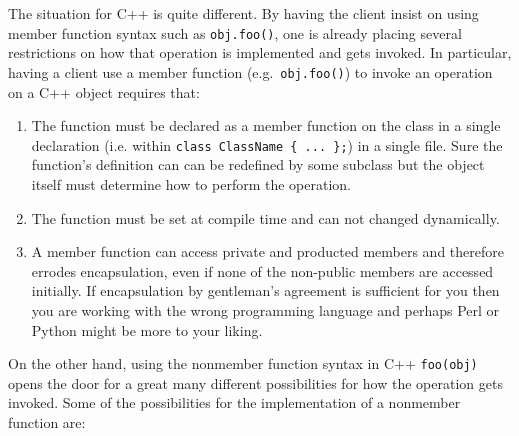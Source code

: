 \documentclass[pdf,ps2pdf,11pt]{SANDreport}
\begin{document}
The situation for C++ is quite different.  By having the client insist on
using member function syntax such as {}\texttt{obj.foo()}, one is already
placing several restrictions on how that operation is implemented and gets
invoked.  In particular, having a client use a member function (e.g.\
{}\texttt{obj.foo()}) to invoke an operation on a C++ object requires that:

\begin{enumerate}

{}\item{}The function must be declared as a member function on the class in a
single declaration (i.e. within {}\texttt{class ClassName \{ ... \};}) in a
single file.  Sure the function's definition can can be redefined by some
subclass but the object itself must determine how to perform the operation.

{}\item{}The function must be set at compile time and can not changed
dynamically.

{}\item{}A member function can access private and producted members and
therefore errodes encapsulation, even if none of the non-public members are
accessed initially.  If encapsulation by gentleman's agreement is sufficient
for you then you are working with the wrong programming language and perhaps
Perl or Python might be more to your liking.

\end{enumerate}

On the other hand, using the nonmember function syntax in C++
{}\texttt{foo(obj)} opens the door for a great many different possibilities
for how the operation gets invoked.  Some of the possibilities for the
implementation of a nonmember function are:
\end{document}
